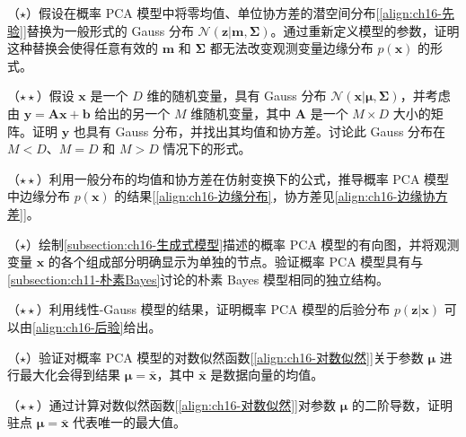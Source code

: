 \documentclass[../../main.tex]{subfiles}
\begin{document}
\begin{exercise}\label{exercise:ch16-04}
（$\star$）假设在概率 PCA 模型中将零均值、单位协方差的潜空间分布[\eqref{align:ch16-先验}]替换为一般形式的 Gauss 分布 $\mathcal{N}(\bm{z}|\bm{m},\bm{\Sigma})$。通过重新定义模型的参数，证明这种替换会使得任意有效的 $\bm{m}$ 和 $\bm{\Sigma}$ 都无法改变观测变量边缘分布 $p(\bm{x})$ 的形式。
\end{exercise}

\begin{exercise}\label{exercise:ch16-05}
（$\star\star$）假设 $\bm{x}$ 是一个 $D$ 维的随机变量，具有 Gauss 分布 $\mathcal{N}(\bm{x}|\bm{\mu},\bm{\Sigma})$，并考虑由 $\bm{y}=\bm{A}\bm{x}+\bm{b}$ 给出的另一个 $M$ 维随机变量，其中 $\bm{A}$ 是一个 $M\times D$ 大小的矩阵。证明 $\bm{y}$ 也具有 Gauss 分布，并找出其均值和协方差。讨论此 Gauss 分布在 $M<D$、$M=D$ 和 $M>D$ 情况下的形式。
\end{exercise}

\begin{exercise}\label{exercise:ch16-06}
（$\star\star$）利用一般分布的均值和协方差在仿射变换下的公式，推导概率 PCA 模型中边缘分布 $p(\bm{x})$ 的结果[\eqref{align:ch16-边缘分布}，协方差见\eqref{align:ch16-边缘协方差}]。
\end{exercise}

\begin{exercise}\label{exercise:ch16-07}
（$\star$）绘制\cref{subsection:ch16-生成式模型}描述的概率 PCA 模型的有向图，并将观测变量 $\bm{x}$ 的各个组成部分明确显示为单独的节点。验证概率 PCA 模型具有与\cref{subsection:ch11-朴素Bayes}讨论的朴素 Bayes 模型相同的独立结构。
\end{exercise}

\begin{exercise}\label{exercise:ch16-08}
（$\star\star$）利用线性-Gauss 模型的结果，证明概率 PCA 模型的后验分布 $p(\bm{z}|\bm{x})$ 可以由\eqref{align:ch16-后验}给出。
\end{exercise}

\begin{exercise}\label{exercise:ch16-09}
（$\star$）验证对概率 PCA 模型的对数似然函数[\eqref{align:ch16-对数似然}]关于参数 $\bm{\mu}$ 进行最大化会得到结果 $\bm{\mu}=\bar{\bm{x}}$，其中 $\bar{\bm{x}}$ 是数据向量的均值。
\end{exercise}

\begin{exercise}\label{exercise:ch16-10}
（$\star\star$）通过计算对数似然函数[\eqref{align:ch16-对数似然}]对参数 $\bm{\mu}$ 的二阶导数，证明驻点 $\bm{\mu}=\bar{\bm{x}}$ 代表唯一的最大值。
\end{exercise}
\end{document}
